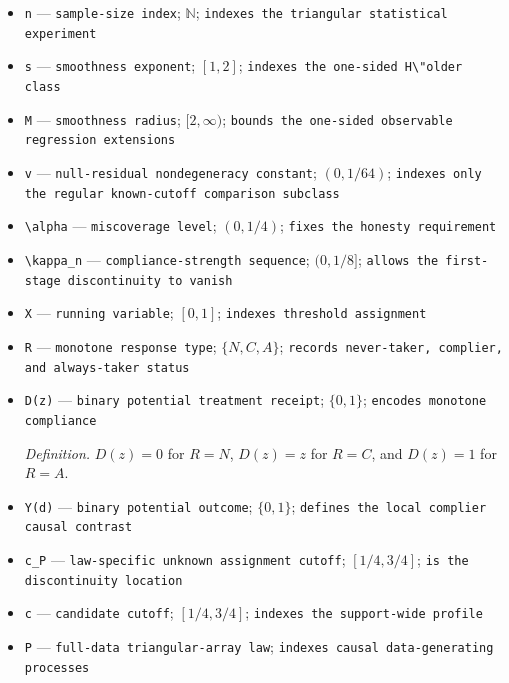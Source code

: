 \documentclass{article}
\begin{document}
\begin{itemize}
  \item \texttt{n} --- \texttt{sample-\allowbreak{}size index}; \(\mathbb N\); \texttt{indexes the triangular statistical experiment}
  \item \texttt{s} --- \texttt{smoothness exponent}; \([1,2]\); \texttt{indexes the one-\allowbreak{}sided H\textbackslash{}\allowbreak{}"older class}
  \item \texttt{M} --- \texttt{smoothness radius}; \([2,\infty)\); \texttt{bounds the one-\allowbreak{}sided observable regression extensions}
  \item \texttt{v} --- \texttt{null-\allowbreak{}residual nondegeneracy constant}; \((0,1/64)\); \texttt{indexes only the regular known-\allowbreak{}cutoff comparison subclass}
  \item \texttt{\textbackslash{}\allowbreak{}alpha} --- \texttt{miscoverage level}; \((0,1/4)\); \texttt{fixes the honesty requirement}
  \item \texttt{\textbackslash{}\allowbreak{}kappa\_\allowbreak{}n} --- \texttt{compliance-\allowbreak{}strength sequence}; \((0,1/8]\); \texttt{allows the first-\allowbreak{}stage discontinuity to vanish}
  \item \texttt{X} --- \texttt{running variable}; \([0,1]\); \texttt{indexes threshold assignment}
  \item \texttt{R} --- \texttt{monotone response type}; \(\{N,C,A\}\); \texttt{records never-\allowbreak{}taker,\allowbreak{} complier,\allowbreak{} and always-\allowbreak{}taker status}
  \item \texttt{D(z)} --- \texttt{binary potential treatment receipt}; \(\{0,1\}\); \texttt{encodes monotone compliance}
  \par\smallskip\noindent\emph{Definition.} \(D(z)=0\) for \(R=N\), \(D(z)=z\) for \(R=C\), and \(D(z)=1\) for \(R=A\).
  \item \texttt{Y(d)} --- \texttt{binary potential outcome}; \(\{0,1\}\); \texttt{defines the local complier causal contrast}
  \item \texttt{c\_\allowbreak{}P} --- \texttt{law-\allowbreak{}specific unknown assignment cutoff}; \([1/4,3/4]\); \texttt{is the discontinuity location}
  \item \texttt{c} --- \texttt{candidate cutoff}; \([1/4,3/4]\); \texttt{indexes the support-\allowbreak{}wide profile}
  \item \texttt{P} --- \texttt{full-\allowbreak{}data triangular-\allowbreak{}array law}; \texttt{indexes causal data-\allowbreak{}generating processes}

\end{itemize}
\end{document}
